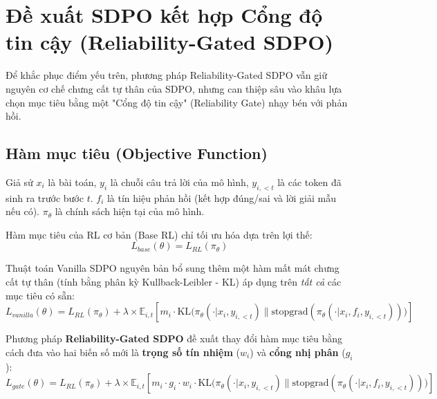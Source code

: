 \documentclass[12pt,a4paper]{report}
\begin{document}
\section{Đề xuất SDPO kết hợp Cổng độ tin cậy (Reliability-Gated SDPO)}
Để khắc phục điểm yếu trên, phương pháp Reliability-Gated SDPO vẫn giữ nguyên cơ chế chưng cất tự thân của SDPO, nhưng can thiệp sâu vào khâu lựa chọn mục tiêu bằng một "Cổng độ tin cậy" (Reliability Gate) nhạy bén với phản hồi.

\subsection{Hàm mục tiêu (Objective Function)}
Giả sử $x_i$ là bài toán, $y_i$ là chuỗi câu trả lời của mô hình, $y_{i,<t}$ là các token đã sinh ra trước bước $t$. $f_i$ là tín hiệu phản hồi (kết hợp đúng/sai và lời giải mẫu nếu có). $\pi_\theta$ là chính sách hiện tại của mô hình.

Hàm mục tiêu của RL cơ bản (Base RL) chỉ tối ưu hóa dựa trên lợi thế:
\begin{equation}
    L_{base}(\theta) = L_{RL}(\pi_\theta)
\end{equation}

Thuật toán Vanilla SDPO nguyên bản bổ sung thêm một hàm mất mát chưng cất tự thân (tính bằng phân kỳ Kullback-Leibler - KL) áp dụng trên \textit{tất cả} các mục tiêu có sẵn:
\begin{equation}
    L_{vanilla}(\theta) = L_{RL}(\pi_\theta) + \lambda \times \mathbb{E}_{i,t} \left[ m_i \cdot \text{KL} \big( \pi_\theta(\cdot | x_i, y_{i,<t}) \| \text{stopgrad}(\pi_\theta(\cdot | x_i, f_i, y_{i,<t})) \big) \right]
\end{equation}

Phương pháp \textbf{Reliability-Gated SDPO} đề xuất thay đổi hàm mục tiêu bằng cách đưa vào hai biến số mới là \textbf{trọng số tín nhiệm} ($w_i$) và \textbf{cổng nhị phân} ($g_i$):
\begin{equation}
    L_{gate}(\theta) = L_{RL}(\pi_\theta) + \lambda \times \mathbb{E}_{i,t} \left[ m_i \cdot g_i \cdot w_i \cdot \text{KL} \big( \pi_\theta(\cdot | x_i, y_{i,<t}) \| \text{stopgrad}(\pi_\theta(\cdot | x_i, f_i, y_{i,<t})) \big) \right]
\end{equation}
\end{document}
